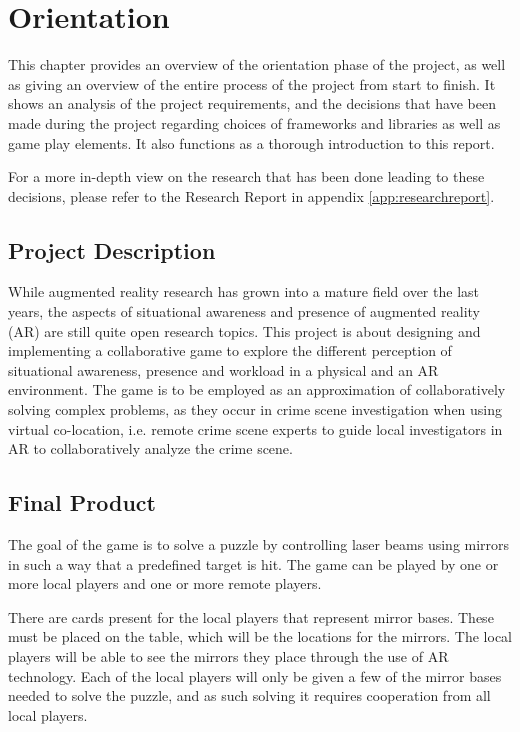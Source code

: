 \chapter{Orientation} \label{cha:orientation}
	This chapter provides an overview of the orientation phase of the project,
	as well as giving an overview of the entire process of the project from start to finish.
	It shows an analysis of the project requirements, and the decisions that
	have been made during the project regarding choices of frameworks and
	libraries as well as game play elements. It also functions as a thorough
	introduction to this report.

	For a more in-depth view on the research that has been done leading to
	these decisions, please refer to the Research Report in appendix
	\ref{app:researchreport}.

	\section{Project Description} \label{sec:projectdescription}
		While augmented reality research has grown into a mature field over the
		last years, the aspects of situational awareness and presence of
		augmented reality (AR) are still quite open research topics. This
		project is about designing and implementing a collaborative game to
		explore the different perception of situational awareness, presence and
		workload in a physical and an AR environment. The game is to be employed
		as an approximation of collaboratively solving complex problems, as they
		occur in crime scene investigation when using virtual co-location, i.e.
		remote crime scene experts to guide local investigators in
		AR to collaboratively analyze the crime scene.

	\section{Final Product} \label{sec:finalproduct}
		The goal of the game is to solve a puzzle by controlling laser beams
		using mirrors in such a way that a predefined target is hit. The game
		can be played by one or more local players and one or more remote players.
		
		There are cards present for the local players that represent mirror
		bases. These must be placed on the table, which will be the locations
		for the mirrors. The local players will be able to see the mirrors they
		place through the use of AR technology. Each of the local players will
		only be given a few of the mirror bases needed to solve the puzzle, and
		as such solving it requires cooperation from all local players.
		
